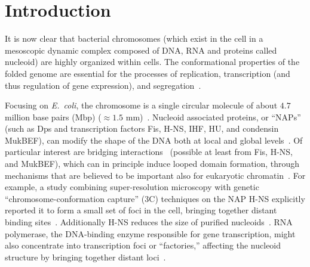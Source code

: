 \documentclass[
preprint,
a4paper,
12pt,
superscriptaddress,
pre]{revtex4}
\begin{document}
\maketitle




\section{Introduction} 

%

It is now clear that bacterial chromosomes (which exist in the cell in
a mesoscopic dynamic complex composed of DNA, RNA and proteins called
nucleoid) are highly organized within cells. The conformational
properties of the folded genome are essential for the processes of
replication, transcription (and thus regulation of gene expression),
and segregation~\cite{Benza2012,Dillon2010,Muskhelishvili2010}.


Focusing on \emph{E.~coli}, the chromosome is a single circular
molecule of about $4.7$ million base pairs (Mbp) ($\approx1.5$
mm)~\cite{Trun1998,Stavans2006}. Nucleoid associated proteins, or
``NAPs'' (such as Dps and transcription factors Fis, H-NS, IHF, HU,
and condensin MukBEF), can modify the shape of the DNA both at local
and global levels~\cite{Dillon2010,LNW+06,Ohniwa2011}.
%
Of particular interest are bridging interactions~\cite{Wiggins2009}
(possible at least from Fis, H-NS, and MukBEF), which can in principle
induce looped domain formation, through mechanisms that are believed
to be important also for eukaryotic
chromatin~\cite{Brackley2013,Barbieri2013b,Junier2010}.  For example,
a study combining super-resolution microscopy with genetic
``chromosome-conformation capture'' (3C) techniques on the NAP H-NS
explicitly reported it to form a small set of foci in the cell,
bringing together distant binding sites~\cite{Wang2011a}. Additionally
H-NS
reduces the size of purified nucleoids~\cite{Thacker2013}.
RNA polymerase, the DNA-binding enzyme responsible for gene
transcription, might also concentrate into transcription foci or
``factories,'' affecting the nucleoid structure by bringing together
distant loci~\cite{JC06,GHH+05}.
\end{document}
